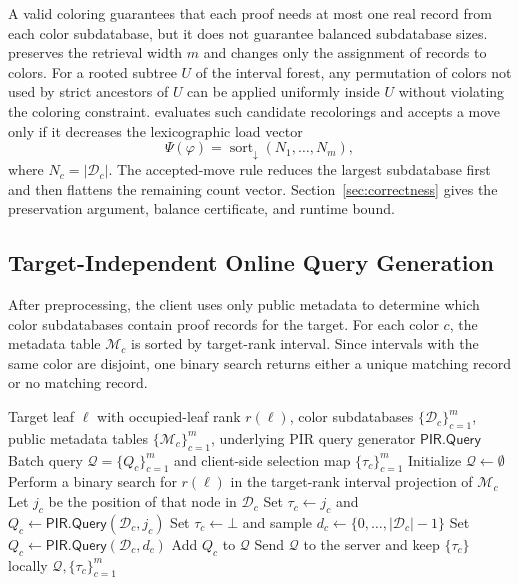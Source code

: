 A valid coloring guarantees that each proof needs at most one real record from each color subdatabase, but it does not guarantee balanced subdatabase sizes. \ActiveBalance{} preserves the retrieval width $m$ and changes only the assignment of records to colors. For a rooted subtree $U$ of the interval forest, any permutation of colors not used by strict ancestors of $U$ can be applied uniformly inside $U$ without violating the coloring constraint. \ActiveBalance{} evaluates such candidate recolorings and accepts a move only if it decreases the lexicographic load vector
\[
\Psi(\varphi)=
\operatorname{sort}_{\downarrow}(N_1,\ldots,N_m),
\]
where $N_c=|\mathcal{D}_c|$. The accepted-move rule reduces the largest subdatabase first and then flattens the remaining count vector. Section~\ref{sec:correctness} gives the preservation argument, balance certificate, and runtime bound.


\subsection{Target-Independent Online Query Generation}

After preprocessing, the client uses only public metadata to determine which color subdatabases contain proof records for the target. For each color $c$, the metadata table $\mathcal{M}_c$ is sorted by target-rank interval. Since intervals with the same color are disjoint, one binary search returns either a unique matching record or no matching record.

\begin{algorithm}[H]
\caption{Online query generation: one PIR subquery per color}
\label{alg:query}
\begin{algorithmic}[1]
\Require Target leaf $\ell$ with occupied-leaf rank $r(\ell)$, color subdatabases $\{\mathcal{D}_c\}_{c=1}^{m}$, public metadata tables $\{\mathcal{M}_c\}_{c=1}^{m}$, underlying PIR query generator $\mathsf{PIR.Query}$
\Ensure Batch query $\mathcal{Q}=\{Q_c\}_{c=1}^{m}$ and client-side selection map $\{\tau_c\}_{c=1}^{m}$
\State Initialize $\mathcal{Q}\gets\emptyset$
  \State Perform a binary search for $r(\ell)$ in the target-rank interval projection of $\mathcal{M}_c$
    \State Let $j_c$ be the position of that node in $\mathcal{D}_c$
    \State Set $\tau_c\gets j_c$ and $Q_c\gets\mathsf{PIR.Query}(\mathcal{D}_c,j_c)$
  \Else
    \State Set $\tau_c\gets \bot$ and sample $d_c\leftarrow\{0,\ldots,|\mathcal{D}_c|-1\}$
    \State Set $Q_c\gets\mathsf{PIR.Query}(\mathcal{D}_c,d_c)$
  \EndIf
  \State Add $Q_c$ to $\mathcal{Q}$
\EndFor
\State Send $\mathcal{Q}$ to the server and keep $\{\tau_c\}$ locally
\State \Return $\mathcal{Q},\{\tau_c\}_{c=1}^{m}$
\end{algorithmic}
\end{algorithm}
\vspace{-0.5em}

